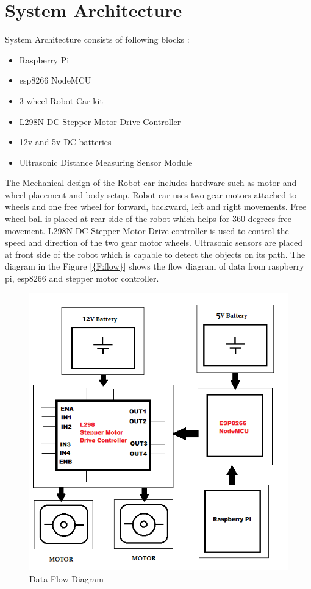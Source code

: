 \documentclass[sigconf]{acmart}
\begin{document}
\section{System Architecture}
System Architecture consists of following blocks :

\begin{itemize}
\item Raspberry Pi
\item esp8266 NodeMCU
\item 3 wheel Robot Car kit
\item L298N DC Stepper Motor Drive Controller
\item 12v and 5v DC batteries
\item Ultrasonic Distance Measuring Sensor Module 
\end{itemize}

The Mechanical design of the Robot car includes hardware such as motor and wheel placement and body setup. Robot car uses two gear-motors attached to wheels and one free wheel for forward, backward, left and right movements. Free wheel ball is placed at rear side of the robot which helps for 360 degrees free movement. L298N DC Stepper Motor Drive controller is used to control the speed and direction of the two gear motor wheels. Ultrasonic sensors are placed at front side of the robot which is capable to detect the objects on its path. The diagram in the Figure \ref{{F:flow}} shows the flow diagram of data from raspberry pi, esp8266 and stepper motor controller.

\begin{figure}[htb]
      \includegraphics[width=\columnwidth]{images/FlowDiagram.png}
      \caption{Data Flow Diagram}\label{F:flow}
\end{figure}
\end{document}
